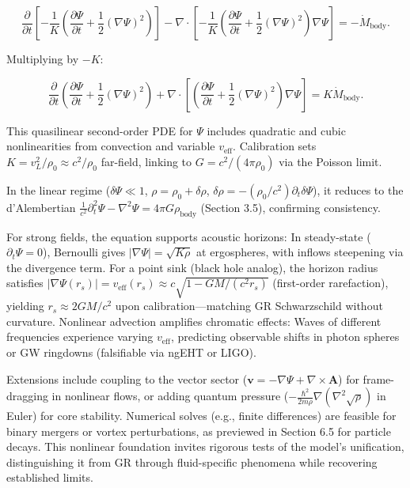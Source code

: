 \documentclass{article}
\begin{document}
\[
\frac{\partial}{\partial t} \left[ -\frac{1}{K} \left( \frac{\partial \Psi}{\partial t} + \frac{1}{2} (\nabla \Psi)^2 \right) \right] - \nabla \cdot \left[ -\frac{1}{K} \left( \frac{\partial \Psi}{\partial t} + \frac{1}{2} (\nabla \Psi)^2 \right) \nabla \Psi \right] = -\dot{M}_{\text{body}}.
\]

Multiplying by $-K$:

\[
\frac{\partial}{\partial t} \left( \frac{\partial \Psi}{\partial t} + \frac{1}{2} (\nabla \Psi)^2 \right) + \nabla \cdot \left[ \left( \frac{\partial \Psi}{\partial t} + \frac{1}{2} (\nabla \Psi)^2 \right) \nabla \Psi \right] = K \dot{M}_{\text{body}}.
\]

This quasilinear second-order PDE for $\Psi$ includes quadratic and cubic nonlinearities from convection and variable $v_{\text{eff}}$. Calibration sets $K = v_L^2 / \rho_0 \approx c^2 / \rho_0$ far-field, linking to $G = c^2 / (4\pi \rho_0)$ via the Poisson limit.

In the linear regime ($\delta \Psi \ll 1$, $\rho = \rho_0 + \delta \rho$, $\delta \rho = -(\rho_0 / c^2) \partial_t \delta \Psi$), it reduces to the d'Alembertian $\frac{1}{c^2} \partial_t^2 \Psi - \nabla^2 \Psi = 4\pi G \rho_{\text{body}}$ (Section 3.5), confirming consistency.

For strong fields, the equation supports acoustic horizons: In steady-state ($\partial_t \Psi = 0$), Bernoulli gives $|\nabla \Psi| = \sqrt{K \rho}$ at ergospheres, with inflows steepening via the divergence term. For a point sink (black hole analog), the horizon radius satisfies $|\nabla \Psi(r_s)| = v_{\text{eff}}(r_s) \approx c \sqrt{1 - GM/(c^2 r_s)}$ (first-order rarefaction), yielding $r_s \approx 2GM/c^2$ upon calibration—matching GR Schwarzschild without curvature. Nonlinear advection amplifies chromatic effects: Waves of different frequencies experience varying $v_{\text{eff}}$, predicting observable shifts in photon spheres or GW ringdowns (falsifiable via ngEHT or LIGO).

Extensions include coupling to the vector sector ($\mathbf{v} = -\nabla \Psi + \nabla \times \mathbf{A}$) for frame-dragging in nonlinear flows, or adding quantum pressure ($-\frac{\hbar^2}{2m \rho} \nabla (\nabla^2 \sqrt{\rho})$ in Euler) for core stability. Numerical solves (e.g., finite differences) are feasible for binary mergers or vortex perturbations, as previewed in Section 6.5 for particle decays. This nonlinear foundation invites rigorous tests of the model's unification, distinguishing it from GR through fluid-specific phenomena while recovering established limits.
\end{document}
